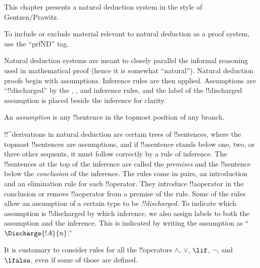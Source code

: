 
\begin{editorial}
This chapter presents a natural deduction system in the style of
Gentzen/Prawitz.
  
To include or exclude material relevant to natural deduction as a
proof system, use the ``prfND'' tag.
\end{editorial}





\begin{explain}
Natural deduction systems are meant to closely parallel the informal
reasoning used in mathematical proof (hence it is somewhat
``natural''). Natural deduction proofs begin with assumptions.
Inference rules are then applied. Assumptions are ``!!{discharged}''
by the \Intro{\lnot}, \Intro{\lif}, \Elim{\lor} and
  \Elim{\lexists} inference rules, and the label of
the !!{discharged} assumption is placed beside the inference for
clarity.
\end{explain}

\begin{defn}[Assumption]
An \emph{assumption} is any !!{sentence}
in the topmost position of any branch.
\end{defn}

!!^{derivation}s in natural deduction are certain trees of
!!{sentence}s, where the topmost !!{sentence}s are assumptions, and if
!!a{sentence} stands below one, two, or three other sequents, it must
follow correctly by a rule of inference. The !!{sentence}s at the top
of the inference are called the \emph{premises} and the !!{sentence}
below the \emph{conclusion} of the inference.  The rules come in
pairs, an introduction and an elimination rule for each
!!{operator}. They introduce !!a{operator} in the conclusion or
remove !!a{operator} from a premise of the rule.  Some of the rules
allow an assumption of a certain type to be \emph{!!{discharged}}. To
indicate which assumption is !!{discharged} by which inference, we
also assign labels to both the assumption and the inference.  This is
indicated by writing the assumption as ``$\Discharge{!A}{n}$.''



It is customary to consider rules for all the !!{operator}s $\land$, $\lor$, $\lif$, $\lnot$, and $\lfalse$, even if some of those are defined.







